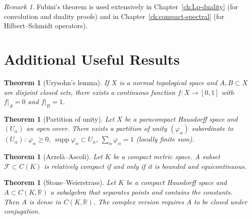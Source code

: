\documentclass[a4paper,12pt]{book}
\DeclareMathOperator{\supp}{supp}
\newcommand{\R}{\mathbb{R}}
\theoremstyle{definition}
\theoremstyle{plain}
\newtheorem{theorem}[definition]{Theorem}
\theoremstyle{remark}
\newtheorem{remark}[definition]{Remark}
\begin{document}
\begin{remark}
Fubini's theorem is used extensively in Chapter~\ref{ch:Lp-duality} (for
convolution and duality proofs) and in Chapter~\ref{ch:compact-spectral} (for
Hilbert--Schmidt operators).
\end{remark}


\section{Additional Useful Results}\label{sec:additional-results}

\begin{theorem}[Urysohn's lemma]\label{thm:urysohn}
If $X$ is a normal topological space and $A, B \subset X$ are disjoint closed
sets, there exists a continuous function $f \colon X \to [0,1]$ with $f|_A = 0$
and $f|_B = 1$.
\end{theorem}

\begin{theorem}[Partition of unity]\label{thm:partition-unity}
Let $X$ be a paracompact Hausdorff space and $(U_\alpha)$ an open cover. There
exists a partition of unity $(\varphi_\alpha)$ subordinate to $(U_\alpha)$:
$\varphi_\alpha \ge 0$, $\supp\varphi_\alpha \subset U_\alpha$,
$\sum_\alpha \varphi_\alpha = 1$ (locally finite sum).
\end{theorem}

\begin{theorem}[Arzel\`a--Ascoli]\label{thm:arzela-ascoli}
Let $K$ be a compact metric space. A subset $\mathcal{F} \subset C(K)$ is
relatively compact if and only if it is bounded and equicontinuous.
\end{theorem}

\begin{theorem}[Stone--Weierstrass]\label{thm:stone-weierstrass-app}
Let $K$ be a compact Hausdorff space and $A \subset C(K, \R)$ a subalgebra that
separates points and contains the constants. Then $A$ is dense in $C(K, \R)$.
The complex version requires $A$ to be closed under conjugation.
\end{theorem}

\end{document}
